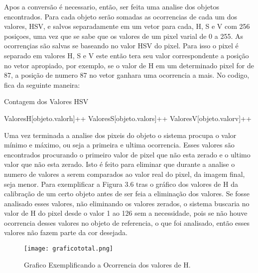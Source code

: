 Apos a conversão é necessario, então, ser feita uma analise dos objetos encontrados. Para cada objeto serão somadas as ocorrencias de cada um dos valores, HSV, e salvos separadamente em um vetor para cada, H, S e V com 256 posiçoes, uma vez que se sabe que os valores de um pixel varial de 0 a 255. As ocorrençias são salvas se baseando no valor HSV do pixel. Para isso o pixel é separado em valores H, S e V este então tera seu valor correspondente a posição no vetor apropiado, por exemplo, se o valor de H em um determinado pixel for de 87, a posição de numero 87 no vetor ganhara uma ocorrencia a mais. No codigo, fica da seguinte maneira:
	        
	        \begin{algorithm}
	       		 \caption{Contagem dos Valores HSV}
		        \begin{algorithmic}
		     	
		   		 \State ValoresH[objeto.valorh]++ 
		    	 \State	ValoresS[objeto.valors]++ 
		     	 \State	ValoresV[objeto.valorv]++
		     	\EndFor
		     		
		        \end{algorithmic}
	        
	        \end{algorithm}
	        
        
Uma vez terminada a analise dos pixeis do objeto o sistema procupa o valor mínimo e máximo, ou seja a primeira e ultima ocorrencia. Esses valores são encontrados procurando o primeiro valor de pixel que não esta zerado e o ultimo valor que não esta zerado. Isto é feito para eliminar que durante a analise o numero de valores a serem comparados ao valor real do pixel, da imagem final, seja menor. Para exemplificar a Figura 3.6 tras o gráfico dos valores de H da calibração de um certo objeto antes de ser feia a eliminação dos valores. Se fosse analisado esses valores, não eliminando os valores zerados, o sistema buscaria no valor de H do pixel desde o valor 1 ao 126 sem a necessidade, pois se não houve ocorrencia desses valores no objeto de referencia, o que foi analisado, então esses valores não fazem parte da cor desejada.

\begin{figure}[!h]
	\centering
	\texttt{[image: graficototal.png]}
	\caption{Grafico Exemplificando a Ocorrencia dos valores de H.}
	\label{Grafico Exemplo}
\end{figure}


